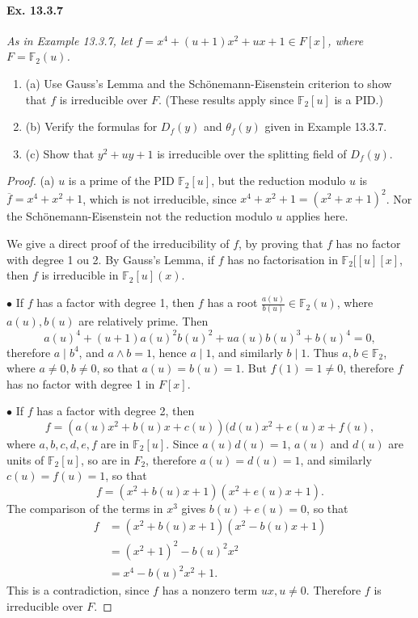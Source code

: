 \documentclass[11pt,a4paper]{article}
\newcommand{\be} {\begin{enumerate}}
\newcommand{\ee} {\end{enumerate}}
\newcommand{\F}{\mathbb{F}}
\begin{document}
\paragraph{Ex. 13.3.7}

{\it As in Example 13.3.7, let $f=x^4+(u+1)x^2+ux+1 \in F[x]$, where $F=\mathbb{F}_2(u)$.
\be
\item[(a)] Use Gauss's Lemma and the Sch\"onemann-Eisenstein criterion to show that $f$ is irreducible over $F$. (These results apply since $\mathbb{F}_2[u]$ is a PID.) 
\item[(b)] Verify the formulas for $D_f(y)$ and $\theta_f(y)$ given in Example 13.3.7.
\item[(c)] Show that $y^2+uy+1$ is irreducible over the splitting field of $D_f(y)$.
\ee
\begin{proof}
\item[(a)] $u$ is a prime of the PID $\F_2[u]$, but the reduction modulo $u$ is $\overline{f} = x^4 + x^2 + 1$, which is not irreducible, since $x^4+x^2+1 = (x^2+x+1)^2$. Nor the Sch\"onemann-Eisenstein not the reduction modulo $u$ applies here.

We give a direct proof of the irreducibility of $f$, by proving that $f$ has no factor with degree 1 ou 2. By Gauss's Lemma, if $f$ has no factorisation in $\F_2[[u] [x]$, then $f$ is irreducible in $\F_2[u] (x)$.

$\bullet$ If $f$ has a factor with degree 1, then $f$ has a root $\frac{a(u)}{b(u)} \in \F_2(u)$, where $a(u), b(u)$ are relatively prime. Then 
$$a(u)^4 + (u+1)a(u)^2b(u)^2 + u a(u) b(u)^3 + b(u)^4 = 0,$$
therefore $a \mid b^4$, and $a \wedge b = 1$, hence $a \mid 1$, and similarly $b \mid 1$. Thus $a, b \in \F_2$, where $a \ne 0, b \ne 0$, so that $a(u) = b(u) = 1$. But $f(1) = 1 \ne 0$, therefore $f$ has no factor with degree 1 in $F[x]$.

$\bullet$ If $f$ has a factor with degree 2, then
$$f = (a(u) x^2 + b(u) x + c(u))(d(u) x^2 +e(u) x + f(u),$$
where $a,b,c,d,e,f$ are in $\F_2[u]$.
Since $a(u) d(u) = 1$, $a(u)$ and $d(u)$ are units of $\F_2[u]$, so are in $F_2$, therefore $a(u) = d(u) = 1$, and similarly $c(u) = f(u) = 1$, so that
$$f = (x^2 + b(u) x + 1)(x^2 + e(u) x + 1).$$
The comparison of the terms in $x^3$ gives $b(u) + e(u) = 0$, so that
\begin{align*}
f &= (x^2 + b(u) x + 1)(x^2 -b(u) x + 1)\\
&=(x^2+1)^2 - b(u)^2 x^2\\
&= x^4 -b(u)^2 x^2 +1.
\end{align*}
This is a contradiction, since $f$ has a nonzero term $u x, u\ne 0$. Therefore $f$ is irreducible over $F$.


\end{proof}}
\end{document}
